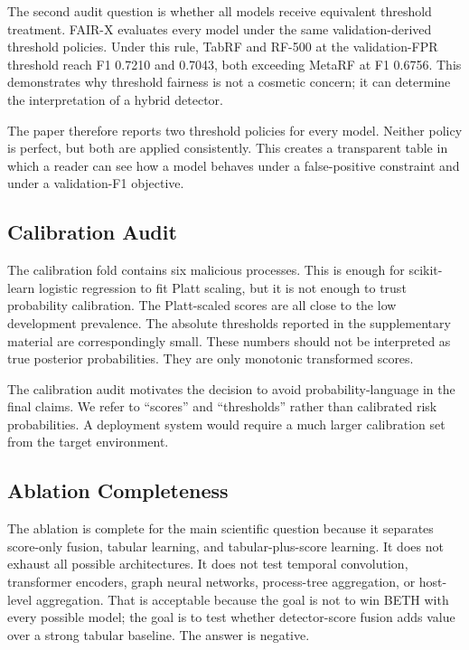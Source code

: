 \documentclass[10pt,journal,compsoc]{IEEEtran}
\begin{document}
The second audit question is whether all models receive equivalent threshold treatment. FAIR-X evaluates every model under the same validation-derived threshold policies. Under this rule, TabRF and RF-500 at the validation-FPR threshold reach F1 0.7210 and 0.7043, both exceeding MetaRF at F1 0.6756. This demonstrates why threshold fairness is not a cosmetic concern; it can determine the interpretation of a hybrid detector.

The paper therefore reports two threshold policies for every model. Neither policy is perfect, but both are applied consistently. This creates a transparent table in which a reader can see how a model behaves under a false-positive constraint and under a validation-F1 objective.

\subsection{Calibration Audit}

The calibration fold contains six malicious processes. This is enough for scikit-learn logistic regression to fit Platt scaling, but it is not enough to trust probability calibration. The Platt-scaled scores are all close to the low development prevalence. The absolute thresholds reported in the supplementary material are correspondingly small. These numbers should not be interpreted as true posterior probabilities. They are only monotonic transformed scores.

The calibration audit motivates the decision to avoid probability-language in the final claims. We refer to ``scores'' and ``thresholds'' rather than calibrated risk probabilities. A deployment system would require a much larger calibration set from the target environment.

\subsection{Ablation Completeness}

The ablation is complete for the main scientific question because it separates score-only fusion, tabular learning, and tabular-plus-score learning. It does not exhaust all possible architectures. It does not test temporal convolution, transformer encoders, graph neural networks, process-tree aggregation, or host-level aggregation. That is acceptable because the goal is not to win BETH with every possible model; the goal is to test whether detector-score fusion adds value over a strong tabular baseline. The answer is negative.
\end{document}

